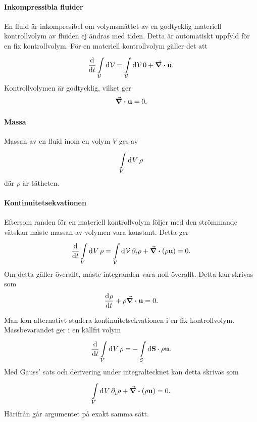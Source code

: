 \paragraph{Inkompressibla fluider}
En fluid är inkompresibel om volymsmåttet av en godtycklig materiell kontrollvolym av fluiden ej ändras med tiden. Detta är automatiskt uppfyld för en fix kontrollvolym. För en materiell kontrollvolym gäller det att
\begin{align*}
	\dv{t}\int\limits_{\mathcal{V}}^{}\dd[]{\mathcal{V}} = \int\limits_{\mathcal{V}}^{}\dd[]{\mathcal{V}}0 + \div{\vb{u}}.
\end{align*}
Kontrollvolymen är godtycklig, vilket ger
\begin{align*}
	\div{\vb{u}} = 0.
\end{align*}

\paragraph{Massa}
Massan av en fluid inom en volym $V$ ges av
\begin{align*}
	\int\limits_{V}^{}\dd[]{V}\rho
\end{align*}
där $\rho$ är tätheten.

\paragraph{Kontinuitetsekvationen}
Eftersom randen för en materiell kontrollvolym följer med den strömmande vätskan måste massan av volymen vara konstant. Detta ger
\begin{align*}
	\dv{t}\int\limits_{V}^{}\dd[]{V}\rho = \int\limits_{\mathcal{V}}^{}\dd[]{\mathcal{V}}\partial_{t}^{}\rho + \div(\rho\vb{u}) = 0.
\end{align*}
Om detta gäller överallt, måste integranden vara noll överallt. Detta kan skrivas som
\begin{align*}
	\dv[]{\rho}{t} + \rho\div{\vb{u}} = 0.
\end{align*}

Man kan alternativt studera kontinuitetsekvationen i en fix kontrollvolym. Massbevarandet ger i en källfri volym
\begin{align*}
	\dv{t}\int\limits_{V}^{}\dd[]{V}\rho = -\int\limits_{S}^{}\dd{\vb{S}}\cdot \rho\vb{u}.
\end{align*}
Med Gauss' sats och derivering under integraltecknet kan detta skrivas som
\begin{align*}
	\int\limits_{V}^{}\dd[]{V}\partial_{t}^{}\rho + \div(\rho\vb{u}) = 0.
\end{align*}
Härifrån går argumentet på exakt samma sätt.

